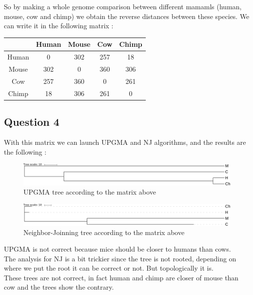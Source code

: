 \documentclass[]{article}
\theoremstyle{definition}
\begin{document}
	So by making a whole genome comparison between different mamamls (human, mouse, cow and chimp) we obtain the reverse distances between these species. We can write it in the following matrix :
	\\
	
\begin{tabular}{|*{5}{c|}}
	\hline
	   & Human  & Mouse  & Cow  & Chimp \\
	\hline
	Human  & 0  & 302  & 257  & 18 \\
	\hline
	Mouse  & 302  & 0  & 360 & 306 \\
	\hline
	Cow  & 257  & 360 & 0 & 261 \\
	\hline
	Chimp  & 18 & 306 & 261 & 0 \\
	\hline
	
\end{tabular}
 
\subsection{Question 4}


With this matrix we can launch UPGMA and NJ algorithms, and the results are the following :
 
\begin{figure}[h!]

	\includegraphics*[width = \linewidth]{../UPGMA1.pdf}
	\caption{\label{upgma1} UPGMA tree according to the matrix above }
\end{figure}


\begin{figure}[h!!]
	\includegraphics*[width = \linewidth]{../NJ1.pdf}
	\caption{\label{nj1} Neighbor-Joinning tree according to the matrix above }
\end{figure}


UPGMA is not correct because mice should be closer to humans than cows.\\
The analysis for NJ is a bit trickier since the tree is not rooted, depending on where we put the root it can be correct or not. But topologically it is.\\
These trees are not correct, in fact human and chimp are closer of mouse than cow and the trees show the contrary. 
\end{document}
